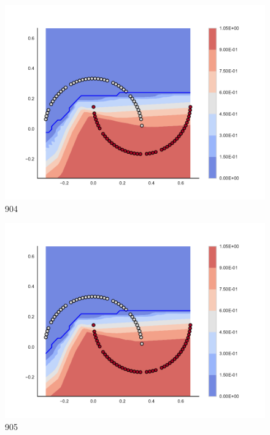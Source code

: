 \begin{subfigure}[b]{0.09\textwidth}
    \includegraphics[clip, trim=2.35cm 1.75cm 4.5cm 0cm,width=\textwidth]{img/convergence/904.pdf}
    \caption{904}
    \label{fig:convergence_904}
\end{subfigure}
%
\begin{subfigure}[b]{0.09\textwidth}
    \includegraphics[clip, trim=2.35cm 1.75cm 4.5cm 0cm,width=\textwidth]{img/convergence/905.pdf}
    \caption{905}
    \label{fig:convergence_905}
\end{subfigure}
%
